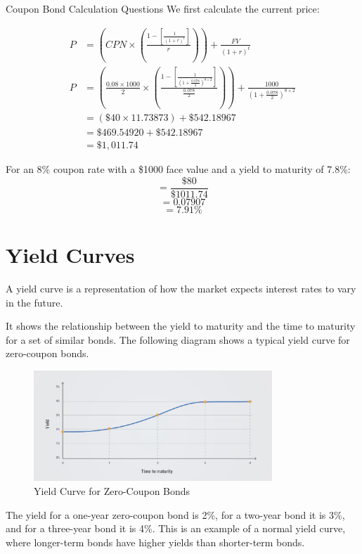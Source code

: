 \begin{examplebox}{Coupon Bond Calculation Questions}
We first calculate the current price:

\begin{align*}
    P&=\left(CPN\times\left(\frac{1-\left[\frac1{\left(1+r\right)^{t}}\right]}{r}\right)\right)+\frac{FV}{\left(1+r\right)^{t}} \\
    P&=\left(\frac{0.08\times1000}{2}\times\left(\frac{1-\left[\frac{1}{(1+\frac{0.078}{2})^{8\times2}}\right]}{\frac{0.078}{2}}\right)\right)+\frac{1000}{\left(1+\frac{0.078}{2}\right)^{8\times2}} \\
    &=(\$40\times11.73873)+\$542.18967 \\
    &=\$469.54920+\$542.18967 \\
    &=\$1,011.74
\end{align*}

For an 8\% coupon rate with a \$1000 face value and a yield to maturity of 7.8\%:
\[ = \frac{\$80}{\$1011.74} \]
\[ = 0.07907 \]
\[ = 7.91\% \]
\end{examplebox}

\renewcommand{\thesection}{2.3 - 2.4}
\section{Yield Curves}
\setcounter{section}{4}
\renewcommand{\thesection}{\arabic{chapter}.\arabic{section}}

A yield curve is a representation of how the market expects interest rates to vary in the future.

It shows the relationship between the yield to maturity and the time to maturity for a set of similar bonds. The following diagram shows a typical yield curve for zero-coupon bonds.

\begin{figure}[H]
    \centering
    \includegraphics[width=0.8\textwidth]{img/2.1.png}
    \caption{Yield Curve for Zero-Coupon Bonds}
    \label{fig:yield_curve}
\end{figure}

The yield for a one-year zero-coupon bond is 2\%, for a two-year bond it is 3\%, and for a three-year bond it is 4\%. This is an example of a normal yield curve, where longer-term bonds have higher yields than shorter-term bonds. \\


